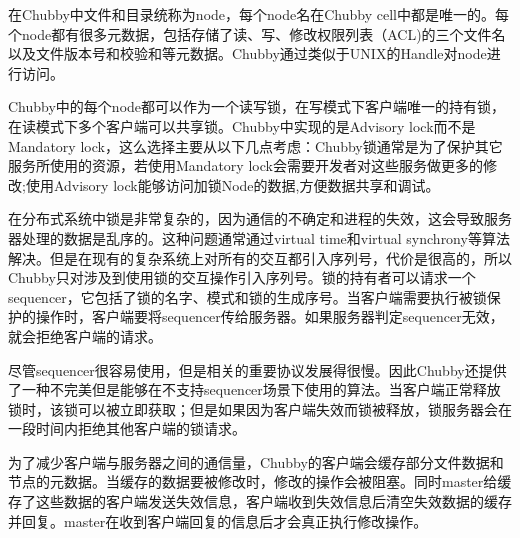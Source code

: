 \documentclass[UTF8]{article}
\begin{document}
	在Chubby中文件和目录统称为node，每个node名在Chubby cell中都是唯一的。每个node都有很多元数据，包括存储了读、写、修改权限列表（ACL)的三个文件名以及文件版本号和校验和等元数据。Chubby通过类似于UNIX的Handle对node进行访问。

	Chubby中的每个node都可以作为一个读写锁，在写模式下客户端唯一的持有锁，在读模式下多个客户端可以共享锁。Chubby中实现的是Advisory lock而不是Mandatory lock，这么选择主要从以下几点考虑：Chubby锁通常是为了保护其它服务所使用的资源，若使用Mandatory lock会需要开发者对这些服务做更多的修改;使用Advisory lock能够访问加锁Node的数据,方便数据共享和调试。
	
	在分布式系统中锁是非常复杂的，因为通信的不确定和进程的失效，这会导致服务器处理的数据是乱序的。这种问题通常通过virtual time和virtual synchrony等算法解决。但是在现有的复杂系统上对所有的交互都引入序列号，代价是很高的，所以Chubby只对涉及到使用锁的交互操作引入序列号。锁的持有者可以请求一个sequencer，它包括了锁的名字、模式和锁的生成序号。当客户端需要执行被锁保护的操作时，客户端要将sequencer传给服务器。如果服务器判定sequencer无效，就会拒绝客户端的请求。

	尽管sequencer很容易使用，但是相关的重要协议发展得很慢。因此Chubby还提供了一种不完美但是能够在不支持sequencer场景下使用的算法。当客户端正常释放锁时，该锁可以被立即获取；但是如果因为客户端失效而锁被释放，锁服务器会在一段时间内拒绝其他客户端的锁请求。
	
	为了减少客户端与服务器之间的通信量，Chubby的客户端会缓存部分文件数据和节点的元数据。当缓存的数据要被修改时，修改的操作会被阻塞。同时master给缓存了这些数据的客户端发送失效信息，客户端收到失效信息后清空失效数据的缓存并回复。master在收到客户端回复的信息后才会真正执行修改操作。
	


	
\end{document}
